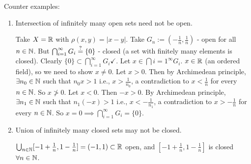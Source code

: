 \documentclass[]{article}
\begin{document}
\begin{remark} Counter examples:
	\begin{enumerate}
		\item Intersection of infinitely many open sets need not be open.
			\begin{example}
				Take $X = \mathbb{R}$ with $\rho(x,y) = |x-y|$.
				Take $G_n := (-\frac{1}{n},\frac{1}{n})$ - open for all $n\in\mathbb{N}$.
				But $\bigcap_{i=1}^\infty G_i \overset{?}{=} \{0\}$ - closed (a set with finitely many elements is closed).
				Clearly $\{0\}\subset \bigcap_{i=1}^\infty G_i \checkmark$.
				\say{$\subset$} Let $x\in\bigcap{i=1}^\infty G_i$.
				$x\in\mathbb{R}$ (an ordered field), so we need to show $x\neq 0$.
				Let $x>0$. Then by Archimedean principle, $\exists n_0\in\mathbb{N}$ such that $n_0 x>1$ i.e., $x>\frac{1}{n_0}$, a contradiction to $x<\frac{1}{n}$ for every $n\in\mathbb{N}$. So $x\ngtr 0$.
				Let $x<0$. Then $-x>0$. By Archimedean principle, $\exists n_1\in\mathbb{N}$ such that $n_1(-x) >1$ i.e., $x<-\frac{1}{n_1}$, a contradiction to $x>-\frac{1}{n}$ for every $n\in\mathbb{N}$.
				So $x = 0 \implies \bigcap_{i=1}^\infty G_i = \{0\}$.
			\end{example}
		\item Union of infinitely many closed sets may not be closed.
			\begin{example}
				$\bigcup_{n\in\mathbb{N}}[-1+\frac{1}{n},1-\frac{1}{n}] = (-1,1)\subset\mathbb{R}$ open, and $[-1+\frac{1}{n},1-\frac{1}{n}]$ is closed $\forall n\in\mathbb{N}$.
			\end{example}
	\end{enumerate}
\end{remark}
\end{document}
